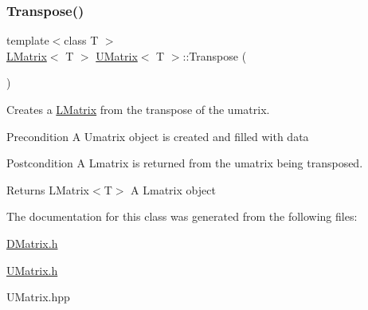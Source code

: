 \subsubsection{\texorpdfstring{Transpose()}{Transpose()}}
{\footnotesize\ttfamily template$<$class T $>$ \\
\mbox{\hyperlink{class_l_matrix}{L\+Matrix}}$<$ T $>$ \mbox{\hyperlink{class_u_matrix}{U\+Matrix}}$<$ T $>$\+::Transpose (\begin{DoxyParamCaption}{ }\end{DoxyParamCaption})}



Creates a \mbox{\hyperlink{class_l_matrix}{L\+Matrix}} from the transpose of the umatrix. 

\begin{DoxyPrecond}{Precondition}
A Umatrix object is created and filled with data 
\end{DoxyPrecond}
\begin{DoxyPostcond}{Postcondition}
A Lmatrix is returned from the umatrix being transposed.
\end{DoxyPostcond}
\begin{DoxyReturn}{Returns}
L\+Matrix$<$\+T$>$ A Lmatrix object 
\end{DoxyReturn}


The documentation for this class was generated from the following files\+:\begin{DoxyCompactItemize}
\item 
\mbox{\hyperlink{_d_matrix_8h}{D\+Matrix.\+h}}\item 
\mbox{\hyperlink{_u_matrix_8h}{U\+Matrix.\+h}}\item 
U\+Matrix.\+hpp\end{DoxyCompactItemize}
